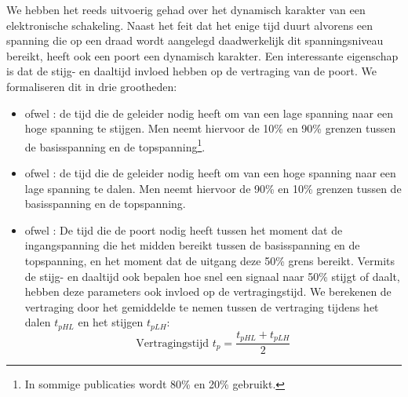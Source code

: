 We hebben het reeds uitvoerig gehad over het dynamisch karakter van een elektronische schakeling. Naast het feit dat het enige tijd duurt alvorens een spanning die op een draad wordt aangelegd daadwerkelijk dit spanningsniveau bereikt, heeft ook een poort een dynamisch karakter. Een interessante eigenschap is dat de stijg- en daaltijd invloed hebben op de vertraging van de poort. We formaliseren dit in drie grootheden:

\begin{itemize}
 \item {} ofwel : de tijd die de geleider nodig heeft om van een lage spanning naar een hoge spanning te stijgen. Men neemt hiervoor de 10\% en 90\% grenzen tussen de basisspanning en de topspanning\footnote{In sommige publicaties wordt 80\% en 20\% gebruikt.}.
 \item {} ofwel : de tijd die de geleider nodig heeft om van een hoge spanning naar een lage spanning te dalen. Men neemt hiervoor de 90\% en 10\% grenzen tussen de basisspanning en de topspanning.
 \item {} ofwel : De tijd die de poort nodig heeft tussen het moment dat de ingangspanning die het midden bereikt tussen de basisspanning en de topspanning, en het moment dat de uitgang deze 50\% grens bereikt. Vermits de stijg- en daaltijd ook bepalen hoe snel een signaal naar 50\% stijgt of daalt, hebben deze parameters ook invloed op de vertragingstijd. We berekenen de vertraging door het gemiddelde te nemen tussen de vertraging tijdens het dalen $t_{pHL}$ en het stijgen $t_{pLH}$:
\begin{equation}
\mbox{Vertragingstijd $t_p$}=\displaystyle\frac{t_{pHL}+t_{pLH}}{2}
\end{equation}
\end{itemize}

